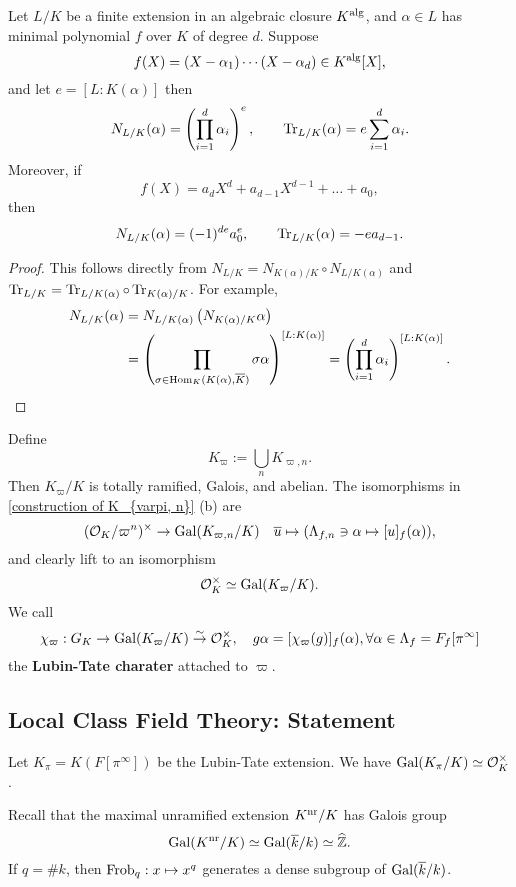 \begin{lemma}\label{compute norm and trace from minimal polynomial}
    Let $L/K$ be a finite extension in an algebraic closure $K^{\mathrm{alg}}$, and $\alpha\in L$ has minimal polynomial $f$ over $K$ of degree $d$. Suppose \[f(X) = (X-\alpha_1)\cdots(X-\alpha_d)\in K^{\mathrm{alg}}[X],\] and let $e = [L : K(\alpha)]$
    then \[N_{L/K}(\alpha) = \left(\prod_{i = 1}^d \alpha_i\right)^e,\qquad \operatorname{Tr}_{L/K}(\alpha) = e\sum_{i = 1}^d \alpha_i.\]
    Moreover, if \[f(X) = a_dX^d + a_{d-1}X^{d-1} + \dots + a_0,\]then \[N_{L/K}(\alpha) = (-1)^{de}a_0^e,\qquad \operatorname{Tr}_{L/K}(\alpha) = -ea_{d-1}.\]
\end{lemma}
\begin{proof}
    This follows directly from $N_{L/K} = N_{K(\alpha)/K}\circ N_{L/K(\alpha)}$ and $\operatorname{Tr}_{L/K} = \operatorname{Tr}_{L/K(\alpha)}\circ \operatorname{Tr}_{K(\alpha)/K}$.
    For example,
    \begin{align*}
        N_{L/K}(\alpha) &= N_{L/K(\alpha)}\left( N_{K(\alpha)/K}\alpha \right)\\ &
        = \left( \prod_{\sigma\in\operatorname{Hom}_{K}(K(\alpha), \overline K)}\sigma\alpha \right)^{[L : K(\alpha)]} = \left( \prod_{i=1}^d\alpha_i  \right)^{[L : K(\alpha)]}.\qedhere
    \end{align*}
\end{proof}


Define \[K_\varpi := \bigcup_{n} K_{\varpi, n}.\]
Then $K_\varpi/K$ is totally ramified, Galois, and abelian.
The isomorphisms in \cref{construction of K_{varpi, n}} (b) are
\[(\mathcal{O}_K/\varpi^n)^\times\to \operatorname{Gal}(K_{\varpi, n}/K)\quad \overline{u}\mapsto (\Lambda_{f, n}\ni \alpha\mapsto [u]_f(\alpha)),\]
and clearly lift to an isomorphism
\[\mathcal{O}_K^\times\simeq \operatorname{Gal}(K_\varpi/K).\]
We call \[\chi_\varpi : G_K\to\operatorname{Gal}(K_\varpi/K)\stackrel{\sim}{\rightarrow} \mathcal{O}_K^\times,\quad g\alpha = [\chi_\varpi(g)]_{f}(\alpha),\forall\alpha\in \Lambda_f = F_f[\pi^\infty]\]
the \textbf{Lubin-Tate charater} attached to $\varpi$.


\subsection{Local Class Field Theory: Statement}
Let $K_\pi = K(F[\pi^\infty])$ be the Lubin-Tate extension. We have $\operatorname{Gal}(K_\pi/K)\simeq \mathcal{O}_K^\times$.

Recall that the maximal unramified extension $K^{\mathrm{nr}}/K$ has Galois group \[\operatorname{Gal}(K^{\mathrm{nr}}/K)\simeq\operatorname{Gal}(\overline k/k)\simeq\widehat{\mathbb{Z}}.\]
If $q = \# k$, then $\operatorname{Frob}_q : x\mapsto x^q$ generates a dense subgroup of $\operatorname{Gal}(\overline k/k)$.

